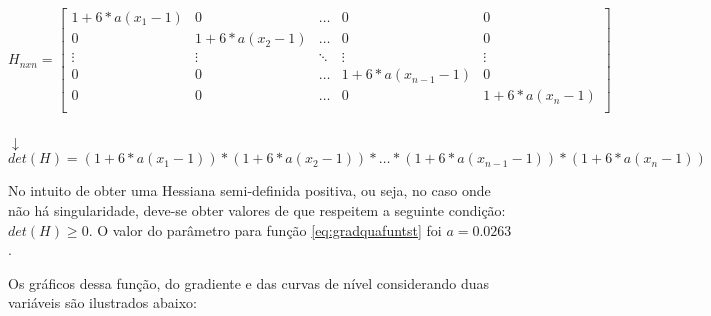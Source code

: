 \begin{equation}\label{eq:hesquafuntst}
    H_{nxn} = \begin{bmatrix}
                    1+6*a(x_1-1) & 0            & \ldots & 0                & 0 \\
                    0            & 1+6*a(x_2-1) & \ldots & 0                & 0 \\
                    \vdots       & \vdots       & \ddots & \vdots           & \vdots \\
                    0            & 0            & \ldots & 1+6*a(x_{n-1}-1) & 0 \\
                    0            & 0            & \ldots & 0                & 1+6*a(x_{n}-1) \\
                \end{bmatrix}    
\end{equation}    
{\centering \\ $\downarrow$\\}
\begin{equation*}
det(H)=(1+6*a(x_1-1))*( 1+6*a(x_2-1))*\ldots*(1+6*a(x_{n-1}-1))*(1+6*a(x_{n}-1))
\end{equation*}

No intuito de obter uma Hessiana semi-definida positiva, ou seja, no caso onde não há singularidade, deve-se obter valores de que respeitem a seguinte condição: $det(H)\geq 0$.
O valor do parâmetro para função \ref{eq:gradquafuntst} foi $a = 0.0263$. 

Os gráficos dessa função, do gradiente e das curvas de nível considerando duas variáveis são ilustrados abaixo:

